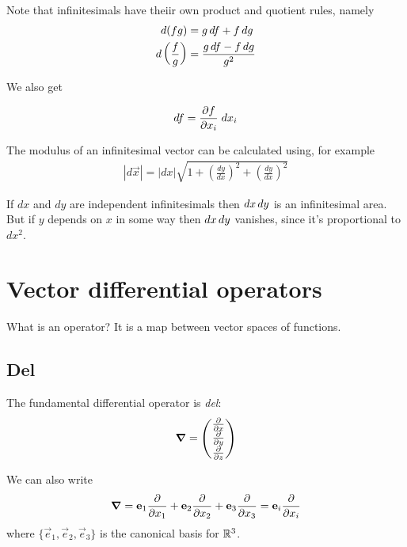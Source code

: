 \documentclass{../../template/note}
\begin{document}
    Note that infinitesimals have theiir own product and quotient rules, namely
    \begin{align*}
        d(fg) &= g \,d{f} + f \,d{g} \\
        d\left(\frac f g\right) &= \frac{g \,d{f} - f \,d{g}}{g^2}
    \end{align*}

    We also get
    \begin{proposition}
        \label{1.3} \[
            df = \pd{f}{x_i} \; dx_i
        \]
    \end{proposition}
    
    
    The modulus of an infinitesimal vector can be calculated using, for example
    \begin{align*}
        |d \vec x| = |dx| \sqrt{1 + \left(\frac{dy}{dx}\right)^2 + \left(\frac{dy}{dx}\right)^2}
    \end{align*}
    
    If \(dx\) and \(dy\) are independent infinitesimals then \(dx \,d{y}\) is an infinitesimal area. But if \(y\) depends on \(x\) in some way then \(dx \,d{y}\) vanishes, since it's proportional to \(dx^2\).
    
    \section{Vector differential operators}
    
    \begin{remark*}
        What is an operator? It is a map between vector spaces of functions.
    \end{remark*}

    \subsection{Del}

    The fundamental differential operator is \emph{del}:
    \begin{align*}
        \grad = \begin{pmatrix}
         \pd{}{x} \\
         \pd{}{y} \\
         \pd{}{z} \\
        \end{pmatrix}
    \end{align*}
    
    We can also write
    \begin{align*}
        \grad = \vec e_1 \pd{}{x_1} + \vec e_2 \pd{}{x_2} + \vec e_3 \pd{}{x_3} = \vec e_i \pd{}{x_i}
    \end{align*}
    where \(\{\vec e_1, \vec e_2, \vec e_3\}\) is the canonical basis for \(\mathbb R^3\).
    
\end{document}
